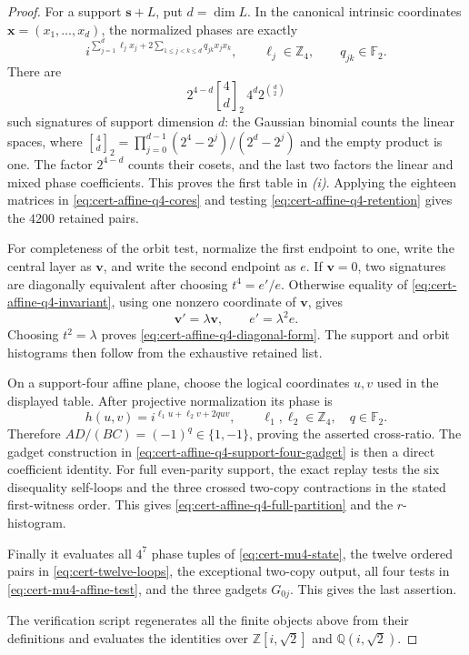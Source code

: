 \documentclass[11pt,letterpaper,onecolumn]{article}
\theoremstyle{plain}
\theoremstyle{definition}
\theoremstyle{remark}
\newcommand{\Ftwo}{\mathbb F_2}
\begin{document}
\begin{proof}
For a support \({\mathbf{s}}+L\), put \(d=\dim L\).  In the canonical intrinsic
coordinates \({\mathbf{x}}=(x_1,\ldots,x_d)\), the normalized phases are exactly
\[
 i^{\sum_{j=1}^d\ell_jx_j+
      2\sum_{1\le j<k\le d}q_{jk}x_jx_k},
 \qquad
 \ell_j\in\mathbb Z_4,\qquad q_{jk}\in\Ftwo.
\]
There are
\[
 2^{4-d}\genfrac[]{0pt}{}{4}{d}_2\,4^d2^{\binom d2}
\]
such signatures of support dimension \(d\): the Gaussian binomial counts
the linear spaces, where
\(\genfrac[]{0pt}{}{4}{d}_2=\prod_{j=0}^{d-1}(2^4-2^j)/(2^d-2^j)\) and the empty
product is one.  The factor \(2^{4-d}\) counts their cosets, and the last two factors the
linear and mixed phase coefficients.  This proves the first table in
\emph{(i)}.  Applying the eighteen matrices in
\cref{eq:cert-affine-q4-cores} and testing
\cref{eq:cert-affine-q4-retention} gives the \(4200\) retained pairs.

For completeness of the orbit test, normalize the first endpoint to one,
write the central layer as \({\mathbf{v}}\), and write the second endpoint as \(e\).
If \({\mathbf{v}}=0\), two signatures are diagonally equivalent after choosing
\(t^4=e'/e\).  Otherwise equality of
\cref{eq:cert-affine-q4-invariant}, using one nonzero coordinate of \({\mathbf{v}}\),
gives
\[
  {\mathbf{v}}'=\lambda {\mathbf{v}},
  \qquad e'=\lambda^2e.
\]
Choosing \(t^2=\lambda\) proves
\cref{eq:cert-affine-q4-diagonal-form}.  The support and orbit histograms
then follow from the exhaustive retained list.

On a support-four affine plane, choose the logical coordinates \(u,v\) used
in the displayed table.  After projective normalization its phase is
\[
 h(u,v)=i^{\ell_1u+\ell_2v+2quv},
 \qquad \ell_1,\ell_2\in\mathbb Z_4,\quad q\in\Ftwo.
\]
Therefore \(AD/(BC)=(-1)^q\in\{1,-1\}\), proving the asserted cross-ratio.
The gadget construction in \cref{eq:cert-affine-q4-support-four-gadget} is then a
direct coefficient identity.  For full even-parity support, the exact replay tests the six disequality self-loops and the three crossed two-copy contractions in the stated
first-witness order. This gives
\cref{eq:cert-affine-q4-full-partition} and the \(r\)-histogram.

Finally it evaluates all \(4^7\) phase tuples of
\cref{eq:cert-mu4-state}, the twelve ordered pairs in
\cref{eq:cert-twelve-loops}, the exceptional two-copy output, all four
tests in \cref{eq:cert-mu4-affine-test}, and the three gadgets
\(G_{0j}\).  This gives the last assertion.

The verification script 
regenerates all the finite objects above from their definitions and
evaluates the identities over \(\mathbb Z[i,\sqrt2]\) and
\(\mathbb Q(i,\sqrt2)\).
\end{proof}
\end{document}
